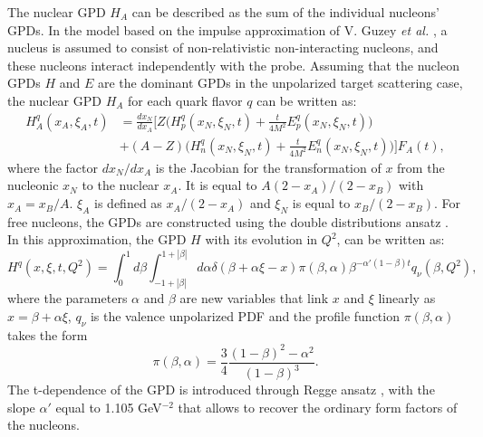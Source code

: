 The nuclear GPD $H_{A}$ can be described as the sum of the individual nucleons' GPDs. In the model based on the impulse approximation of V. Guzey {\it et al.} \cite{EMC_vadim_1, EMC_vadim_3}, a nucleus  is assumed to consist of non-relativistic non-interacting nucleons, and these nucleons interact independently with the probe. Assuming that the nucleon GPDs $H$ and $E$ are the dominant GPDs in the unpolarized target scattering case, the nuclear GPD $H_{A}$ for each quark flavor $q$ can be written as:
\begin{align}
H_{A}^{q}(x_A, \xi_{A}, t) &= \frac{dx_{N}}{dx_{A}} \Bigg[ Z \bigg( H^q_p(x_{N}, 
\xi_{N}, t) + \frac{t}{4 M^2} E^q_p(x_{N}, \xi_{N}, t) \bigg)\\ \nonumber
& + (A-Z) \bigg( H^q_n(x_{N}, \xi_{N}, t) + \frac{t}{4 M^2} E^q_n(x_{N}, \xi_{N}, t) 
\bigg) \Bigg] F_{A}(t),
\label{eq:guzey}
\end{align}
where the factor $dx_{N}/dx_{A}$ is the Jacobian for the transformation of $x$ 
from the nucleonic $x_N$ to the nuclear $x_{A}$. It is equal to $ 
A(2-x_{A})/(2-x_{B})$ with $x_A = x_B/A$. $\xi_{A}$ is defined as 
$x_{A}/(2-x_{A})$ and $\xi_{N}$ is equal to $x_B/(2-x_B)$. For free nucleons, the 
GPDs are constructed using the double distributions ansatz 
\cite{free_proton_GPDs}.  In this approximation, the GPD $H$ with its evolution 
in $Q^2$, can be written as:
\begin{equation}
H^{q}(x,\xi,t, Q^2) = \int_{0}^{1}d\beta \int_{-1+|\beta|}^{1+|\beta|} d\alpha \delta(\beta +\alpha \xi -x) \pi(\beta, \alpha) \beta^{-\alpha'(1-\beta)t} q_{\nu}(\beta, Q^2),
\end{equation} 
where the parameters $\alpha$ and $\beta$ are new variables that link $x$ and $\xi$ linearly as $x = \beta + \alpha \xi$, $q_{\nu}$ is the valence unpolarized PDF and the profile function $\pi(\beta, \alpha)$ takes the form
\begin{equation}
\pi(\beta, \alpha) = \frac{3}{4} \frac{(1-\beta)^2 - \alpha^2}{(1-\beta)^3}.
\end{equation}
The t-dependence of the GPD is introduced through Regge ansatz \cite{guidal_2}, with the slope $\alpha'$ equal to 1.105 GeV$^{-2}$ that allows to recover the ordinary form factors of the nucleons. 


